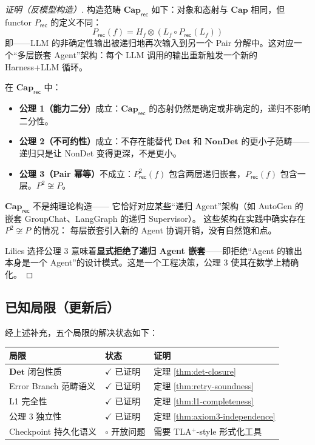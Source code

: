 \documentclass[11pt,a4paper]{article}
\theoremstyle{definition}
\theoremstyle{definition}
\theoremstyle{remark}
\newcommand{\cat}[1]{\mathbf{#1}}
\newcommand{\catCap}{\cat{Cap}}
\newcommand{\catDet}{\cat{Det}}
\newcommand{\catNonDet}{\cat{NonDet}}
\newcommand{\tensor}{\otimes}
\newcommand{\pairMonad}{P}
\begin{document}
\begin{proof}[证明（反模型构造）]
构造范畴 $\catCap_{\mathsf{rec}}$ 如下：对象和态射与 $\catCap$ 相同，但 functor $\pairMonad_{\mathsf{rec}}$ 的定义不同：
\[
\pairMonad_{\mathsf{rec}}(f) = H_f \tensor (L_f \circ \pairMonad_{\mathsf{rec}}(L_f))
\]
即——LLM 的非确定性输出被递归地再次输入到另一个 Pair 分解中。这对应一个``多层嵌套 Agent''架构：每个 LLM 调用的输出重新触发一个新的 Harness+LLM 循环。

在 $\catCap_{\mathsf{rec}}$ 中：
\begin{itemize}[leftmargin=2em]
    \item \textbf{公理 1（能力二分）}成立：$\catCap_{\mathsf{rec}}$ 的态射仍然是确定或非确定的，递归不影响二分性。
    \item \textbf{公理 2（不可约性）}成立：不存在能替代 $\catDet$ 和 $\catNonDet$ 的更小子范畴——递归只是让 NonDet 变得更深，不是更小。
    \item \textbf{公理 3（Pair 幂等）}不成立：$\pairMonad_{\mathsf{rec}}^2(f)$ 包含两层递归嵌套，$\pairMonad_{\mathsf{rec}}(f)$ 包含一层。$P^2 \not\cong P$。
\end{itemize}

$\catCap_{\mathsf{rec}}$ 不是纯理论构造——
它恰好对应某些``递归 Agent''架构（如 AutoGen 的嵌套 GroupChat、LangGraph 的递归 Supervisor）。
这些架构在实践中确实存在 $P^2 \not\cong P$ 的情况：
每层嵌套引入新的 Agent 协调开销，没有自然饱和点。

Lilies 选择公理 3 意味着\textbf{显式拒绝了递归 Agent 嵌套}——即拒绝``Agent 的输出本身是一个 Agent''的设计模式。这是一个工程决策，公理 3 使其在数学上精确化。
\end{proof}

\subsection{已知局限（更新后）}

经上述补充，五个局限的解决状态如下：

\begin{center}
\begin{tabular}{@{}lll@{}}
\toprule
\textbf{局限} & \textbf{状态} & \textbf{证明} \\
\midrule
$\catDet$ 闭包性质 & $\checkmark$ 已证明 & 定理 \ref{thm:det-closure} \\
Error Branch 范畴语义 & $\checkmark$ 已证明 & 定理 \ref{thm:retry-soundness} \\
L1 完全性 & $\checkmark$ 已证明 & 定理 \ref{thm:l1-completeness} \\
公理 3 独立性 & $\checkmark$ 已证明 & 定理 \ref{thm:axiom3-independence} \\
Checkpoint 持久化语义 & $\circ$ 开放问题 & 需要 TLA$^{+}$-style 形式化工具 \\
\bottomrule
\end{tabular}
\end{center}
\end{document}
